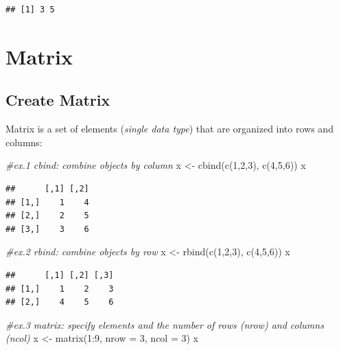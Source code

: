 \documentclass[
]{book}
\newenvironment{Shaded}{\begin{snugshade}}{\end{snugshade}}
\newcommand{\AttributeTok}[1]{\textcolor[rgb]{0.77,0.63,0.00}{#1}}
\newcommand{\CommentTok}[1]{\textcolor[rgb]{0.56,0.35,0.01}{\textit{#1}}}
\newcommand{\DecValTok}[1]{\textcolor[rgb]{0.00,0.00,0.81}{#1}}
\newcommand{\FunctionTok}[1]{\textcolor[rgb]{0.00,0.00,0.00}{#1}}
\newcommand{\NormalTok}[1]{#1}
\newcommand{\OtherTok}[1]{\textcolor[rgb]{0.56,0.35,0.01}{#1}}
\newcommand{\SpecialCharTok}[1]{\textcolor[rgb]{0.00,0.00,0.00}{#1}}
\begin{document}
\begin{verbatim}
## [1] 3 5
\end{verbatim}

\hypertarget{matrix}{%
\section{Matrix}\label{matrix}}

\hypertarget{create-matrix}{%
\subsection{Create Matrix}\label{create-matrix}}

Matrix is a set of elements (\emph{single data type}) that are organized into rows and columns:

\begin{Shaded}
\begin{Highlighting}[]
\CommentTok{\#ex.1 cbind: combine objects by column}
\NormalTok{x }\OtherTok{\textless{}{-}} \FunctionTok{cbind}\NormalTok{(}\FunctionTok{c}\NormalTok{(}\DecValTok{1}\NormalTok{,}\DecValTok{2}\NormalTok{,}\DecValTok{3}\NormalTok{), }\FunctionTok{c}\NormalTok{(}\DecValTok{4}\NormalTok{,}\DecValTok{5}\NormalTok{,}\DecValTok{6}\NormalTok{))}
\NormalTok{x}
\end{Highlighting}
\end{Shaded}

\begin{verbatim}
##      [,1] [,2]
## [1,]    1    4
## [2,]    2    5
## [3,]    3    6
\end{verbatim}

\begin{Shaded}
\begin{Highlighting}[]
\CommentTok{\#ex.2 rbind: combine objects by row}
\NormalTok{x }\OtherTok{\textless{}{-}} \FunctionTok{rbind}\NormalTok{(}\FunctionTok{c}\NormalTok{(}\DecValTok{1}\NormalTok{,}\DecValTok{2}\NormalTok{,}\DecValTok{3}\NormalTok{), }\FunctionTok{c}\NormalTok{(}\DecValTok{4}\NormalTok{,}\DecValTok{5}\NormalTok{,}\DecValTok{6}\NormalTok{))}
\NormalTok{x}
\end{Highlighting}
\end{Shaded}

\begin{verbatim}
##      [,1] [,2] [,3]
## [1,]    1    2    3
## [2,]    4    5    6
\end{verbatim}

\begin{Shaded}
\begin{Highlighting}[]
\CommentTok{\#ex.3 matrix: specify elements and the number of rows (nrow) and columns (ncol)}
\NormalTok{x }\OtherTok{\textless{}{-}} \FunctionTok{matrix}\NormalTok{(}\DecValTok{1}\SpecialCharTok{:}\DecValTok{9}\NormalTok{, }\AttributeTok{nrow =} \DecValTok{3}\NormalTok{, }\AttributeTok{ncol =} \DecValTok{3}\NormalTok{)}
\NormalTok{x}
\end{Highlighting}
\end{Shaded}
\end{document}
